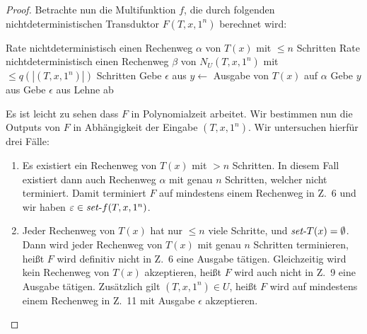 \begin{proof}
    Betrachte nun die Multifunktion $f$, die durch folgenden nichtdeterministischen Transduktor $F(T, x, 1^n)$ berechnet wird:\par
    \begin{algorithm}[H]
        Rate nichtdeterministisch einen Rechenweg $\alpha$ von $T(x)$ mit $\leq n$ Schritten\;
        Rate nichtdeterministisch einen Rechenweg $\beta$ von $N_U(T, x, 1^n)$ mit $\leq q(|(T, x, 1^n)|)$ Schritten\;
        {
            Gebe $\epsilon$ aus\;
        }
        {
            $y\gets $ Ausgabe von $T(x)$ auf $\alpha$\;
            Gebe $y$ aus\;
        }
        {
            Gebe $\epsilon$ aus\;
        }
        \Else
        {
            Lehne ab\;
        }
    \end{algorithm}
    Es ist leicht zu sehen dass $F$ in Polynomialzeit arbeitet. 
    Wir bestimmen nun die Outputs von $F$  in Abhängigkeit der Eingabe $(T, x, 1^n)$.
    Wir untersuchen hierfür drei Fälle:
    \begin{enumerate}[label=\arabic*.]
        \item Es existiert ein Rechenweg von $T(x)$ mit $>n$ Schritten. In diesem Fall existiert dann auch Rechenweg $\alpha$ mit genau $n$ Schritten, welcher nicht terminiert. Damit terminiert $F$ auf mindestens einem Rechenweg in Z.~6 und wir haben $\varepsilon\in \mathit{set}\text{-}{f}(T, x, 1^n)$.
        \item Jeder Rechenweg von $T(x)$ hat nur $\leq n$ viele Schritte, und $\mathit{set}\text{-}{T}(x)=\emptyset$. 
            Dann wird jeder Rechenweg von $T(x)$ mit genau $n$ Schritten terminieren, heißt $F$ wird definitiv nicht in Z.~6 eine Ausgabe tätigen.
            Gleichzeitig wird kein Rechenweg von $T(x)$ akzeptieren, heißt $F$ wird auch nicht in Z.~9 eine Ausgabe tätigen.
            Zusätzlich gilt $(T, x, 1^n)\in U$, heißt $F$ wird auf mindestens einem Rechenweg in Z.~11 mit Ausgabe $\epsilon$ akzeptieren.

\end{enumerate}
\end{proof}
